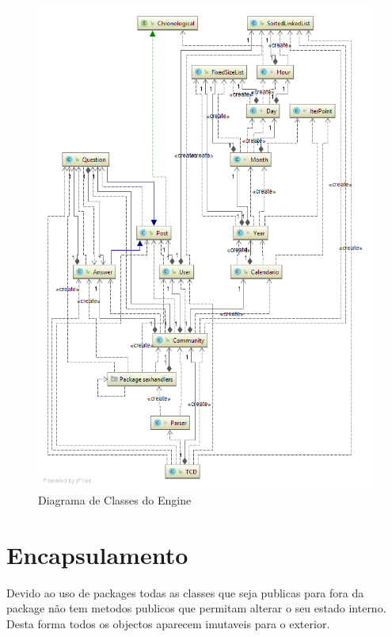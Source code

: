 \documentclass[10pt,a4paper]{report}
\begin{document}
    \begin{figure}[h]
        \centering
        \includegraphics[width=\textwidth]{./images/FullDiagram.png}
        \caption{Diagrama de Classes do Engine}
        \label{fig:fulldiagram}
    \end{figure}


\chapter{Encapsulamento}
    Devido ao uso de packages todas as classes que seja publicas para fora da
    package não tem metodos publicos que permitam alterar o seu estado interno.
    Desta forma todos os objectos aparecem imutaveis para o exterior.
\end{document}
